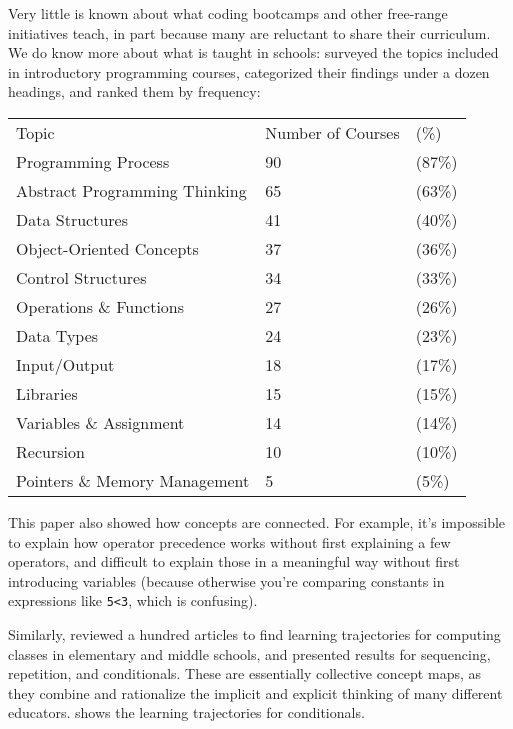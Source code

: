 
Very little is known about what coding bootcamps and other free-range initiatives teach, in part because many are reluctant to share their curriculum. We do know more about what is taught in schools: \cite{Luxt2017} surveyed the topics included in introductory programming courses, categorized their findings under a dozen headings, and ranked them by frequency:

\begin{longtable}{lll}
Topic & Number of Courses & (\%)\\
Programming Process & 90 & (87\%)\\
Abstract Programming Thinking & 65 & (63\%)\\
Data Structures & 41 & (40\%)\\
Object-Oriented Concepts & 37 & (36\%)\\
Control Structures & 34 & (33\%)\\
Operations \& Functions & 27 & (26\%)\\
Data Types & 24 & (23\%)\\
Input/Output & 18 & (17\%)\\
Libraries & 15 & (15\%)\\
Variables \& Assignment & 14 & (14\%)\\
Recursion & 10 & (10\%)\\
Pointers \& Memory Management & 5 & (5\%)\\
\end{longtable}

This paper also showed how concepts are connected. For example, it's impossible to explain how operator precedence works without first explaining a few operators, and difficult to explain those in a meaningful way without first introducing variables (because otherwise you're comparing constants in expressions like \texttt{5\textless{}3}, which is confusing).

Similarly, \cite{Rich2017} reviewed a hundred articles to find learning trajectories for computing classes in elementary and middle schools, and presented results for sequencing, repetition, and conditionals. These are essentially collective concept maps, as they combine and rationalize the implicit and explicit thinking of many different educators.  shows the learning trajectories for conditionals.


